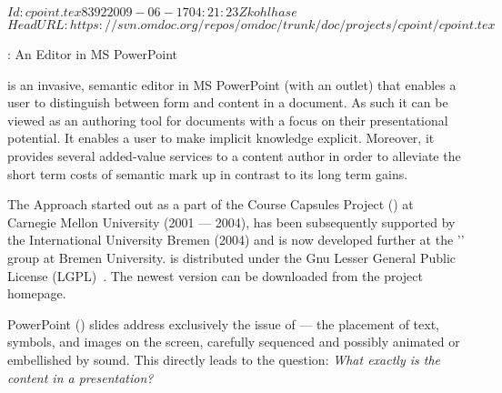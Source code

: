 \svnInfo $Id: cpoint.tex 8392 2009-06-17 04:21:23Z kohlhase $
\svnKeyword $HeadURL: https://svn.omdoc.org/repos/omdoc/trunk/doc/projects/cpoint/cpoint.tex $

\begin{omgroup}[id=cpoint,short=\cpoint,creators=ako]
                           {\cpoint: An {\omdoc} Editor in MS PowerPoint}
\def\cpauthor{\scsys{CPointAuthor}}
\def\cpstudent{\scsys{CPointStudent}}
\def\cpbasic{\scsys{CPointBasic}} 
\def\cpgraphs{\scsys{CPointGraphs}}
\def\cpimport{\scsys{CPointImport}}
\def\cpnotes{\scsys{CPointNotes}}
\def\texpoint{\scsys{TexPoint}} 


{\cpoint} is an invasive, semantic {\omdoc} editor in MS PowerPoint (with an {\omdoc}
outlet) that enables a user to distinguish between form and content in a document. As such
it can be viewed as an authoring tool for {\omdoc} documents with a focus on their
presentational potential. It enables a user to make implicit knowledge explicit. Moreover,
it provides several added-value services to a content author in order to alleviate the
short term costs of semantic mark up in contrast to its long term gains.

\begin{omgroup}[id=cpoint.background]{The {\cpoint} Approach}
{\cpoint} started out as a part of the Course Capsules Project
({\ccaps}) at Carnegie Mellon University (2001 --- 2004), has been subsequently supported by the
International University Bremen (2004) and is now developed further at the '{}' group at Bremen University. {\cpoint} is distributed under
the Gnu Lesser General Public License (LGPL)~\cite{LGPL}.  The newest version can be
downloaded from the project homepage.

PowerPoint ({\ppt}) slides address exclusively the issue of {} ---
the placement of text, symbols, and images on the screen, carefully sequenced and possibly
animated or embellished by sound. This directly leads to the question: {\emph{What exactly
    is the content in a {\ppt} presentation?}}


\end{omgroup}
\end{omgroup}
